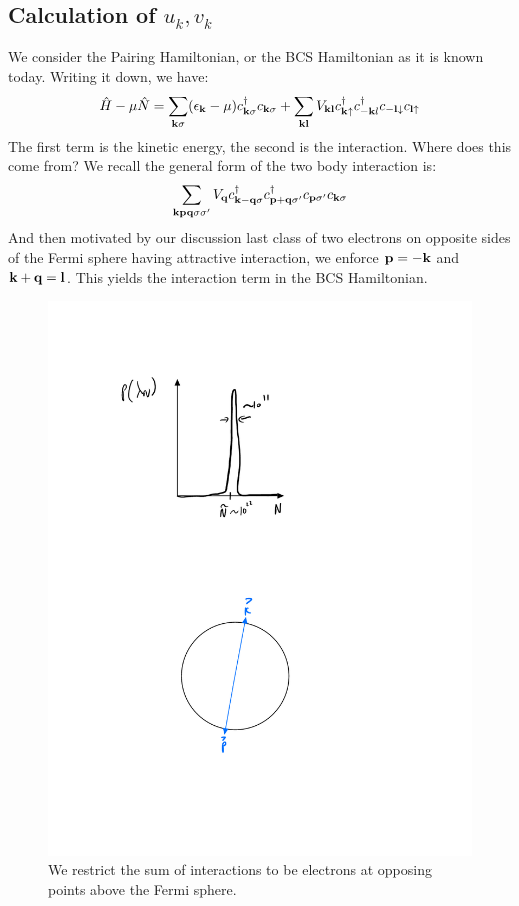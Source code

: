 \subsection{Calculation of $u_k, v_k$}
We consider the Pairing Hamiltonian, or the BCS Hamiltonian as it is known today. Writing it down, we have:
\begin{equation}
    \hat{H} - \mu \hat{N} = \sum_{\mathbf{k}\sigma}(\epsilon_{\mathbf{k}} - \mu)c^{\dagger}_{\mathbf{k}\sigma}c_{\mathbf{k}\sigma} + \sum_{\mathbf{k}\mathbf{l}}V_{\mathbf{k}\mathbf{l}}c^\dagger_{\mathbf{k}\uparrow}c^\dagger_{-\mathbf{k}l}c_{-\mathbf{l}\downarrow}c_{\mathbf{l}\uparrow}
\end{equation}
The first term is the kinetic energy, the second is the interaction. Where does this come from? We recall the general form of the two body interaction is:
\begin{equation}
    \sum_{\mathbf{kpq}\sigma\sigma'} V_{\mathbf{q}}c^\dagger_{\mathbf{k} - \mathbf{q}\sigma}c^\dagger_{\mathbf{p} + \mathbf{q}\sigma'}c_{\mathbf{p}\sigma'}c_{\mathbf{k}\sigma}
\end{equation}
And then motivated by our discussion last class of two electrons on opposite sides of the Fermi sphere having attractive interaction, we enforce $\mathbf{p} = -\mathbf{k}$ and $\mathbf{k} + \mathbf{q} = \mathbf{l}$. This yields the interaction term in the BCS Hamiltonian.

\begin{figure}[htbp]
    \centering
    \includegraphics[scale=0.7]{Images/fig-fermisphereopposingelectrons.pdf}
    \caption{We restrict the sum of interactions to be electrons at opposing points above the Fermi sphere.}
    \label{fig-fermisphereopposingelectrons}
\end{figure}

